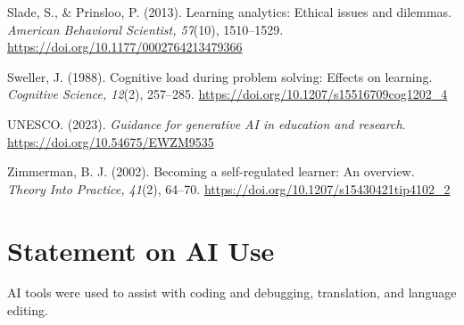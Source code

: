 \documentclass[11pt]{article}
\begin{document}
\begin{references}
\item Slade, S., \& Prinsloo, P. (2013). Learning analytics: Ethical issues and dilemmas. \textit{American Behavioral Scientist, 57}(10), 1510–1529. \url{https://doi.org/10.1177/0002764213479366}
\item Sweller, J. (1988). Cognitive load during problem solving: Effects on learning. \textit{Cognitive Science, 12}(2), 257–285. \url{https://doi.org/10.1207/s15516709cog1202_4}
\item UNESCO. (2023). \textit{Guidance for generative AI in education and research}. \url{https://doi.org/10.54675/EWZM9535}
\item Zimmerman, B. J. (2002). Becoming a self-regulated learner: An overview. \textit{Theory Into Practice, 41}(2), 64–70. \url{https://doi.org/10.1207/s15430421tip4102_2}
\end{references}

\section*{Statement on AI Use}

AI tools were used to assist with coding and debugging, translation, and language editing.
\end{document}
